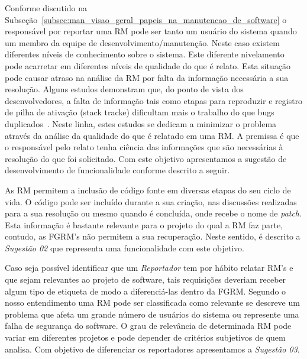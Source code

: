 Conforme discutido na
Subseção~\ref{subsec:man_visao_geral_papeis_na_manutencao_de_software} o
responsável por reportar uma RM pode ser tanto um usuário do sistema quando um
membro da equipe de desenvolvimento/manutenção. Neste caso existem diferentes
níveis de conhecimento sobre o sistema. Este diferente nivelamento pode
acarretar em diferentes níveis de qualidade do que é relato. Esta situação pode
causar atraso na análise da RM por falta da informação necessária a sua
resolução. Alguns estudos demonstram que, do ponto de vista dos desenvolvedores,
a falta de informação tais como etapas para reproduzir e registro de pilha de
ativação (stack tracke) dificultam mais o trabalho do que bugs
duplicados~\cite{bettenburg2008makes, bettenburg2007quality}. Neste linha, estes
estudos se dedicam a minimizar o problema através da análise da qualidade do que
é relatado em uma RM\@. A premissa é que o responsável pelo relato tenha ciência
das informações que são necessárias à resolução do que foi solicitado. Com este
objetivo apresentamos a sugestão de desenvolvimento de funcionalidade conforme
descrito a seguir.


As RM permitem a inclusão de código fonte em diversas etapas do seu ciclo de
vida. O código pode ser incluído durante a sua criação, nas discussões
realizadas para a sua resolução ou mesmo quando é concluída, onde recebe o nome
de \textit{patch.} Esta informação é bastante relevante para o projeto do qual a
RM faz parte, contudo, as FGRM's não permitem a sua recuperação. Neste sentido,
é descrito a \textit{Sugestão 02} que representa uma funcionalidade com este
objetivo.


Caso seja possível identificar que um \textit{Reportador} tem por hábito relatar
RM's e que sejam relevantes ao projeto de software, tais requisições deveriam
receber algum tipo de etiqueta de modo a diferenciá-las dentro da FGRM\@.
Segundo o nosso entendimento uma RM pode ser classificada como relevante se
descreve um problema que afeta um grande número de usuários do sistema ou
represente uma falha de segurança do software. O grau de relevância de
determinada RM pode variar em diferentes projetos e pode depender de critérios
subjetivos de quem analisa. Com objetivo de diferenciar os reportadores
apresentamos a \textit{Sugestão 03}.

